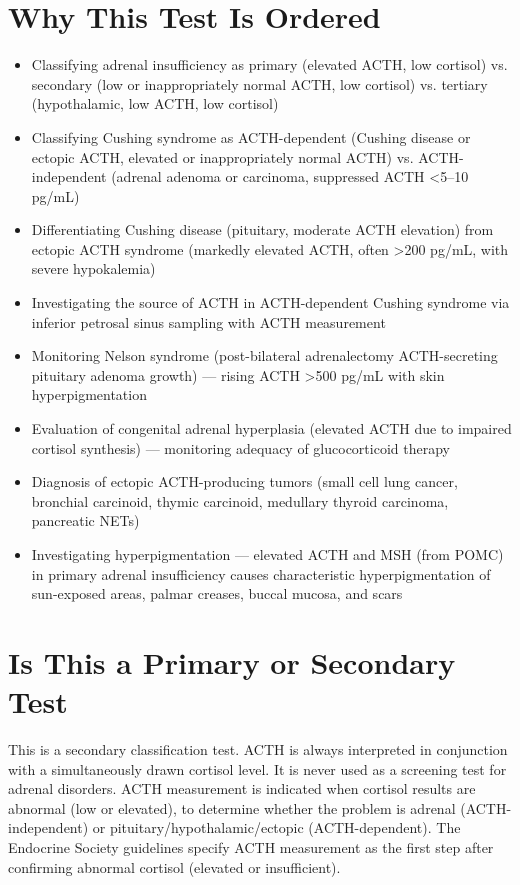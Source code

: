 \section*{Why This Test Is Ordered}
\begin{itemize}
  \item Classifying adrenal insufficiency as primary (elevated ACTH, low cortisol) vs. secondary (low or inappropriately normal ACTH, low cortisol) vs. tertiary (hypothalamic, low ACTH, low cortisol)
  \item Classifying Cushing syndrome as ACTH-dependent (Cushing disease or ectopic ACTH, elevated or inappropriately normal ACTH) vs. ACTH-independent (adrenal adenoma or carcinoma, suppressed ACTH <5--10 pg/mL)
  \item Differentiating Cushing disease (pituitary, moderate ACTH elevation) from ectopic ACTH syndrome (markedly elevated ACTH, often >200 pg/mL, with severe hypokalemia)
  \item Investigating the source of ACTH in ACTH-dependent Cushing syndrome via inferior petrosal sinus sampling with ACTH measurement
  \item Monitoring Nelson syndrome (post-bilateral adrenalectomy ACTH-secreting pituitary adenoma growth) --- rising ACTH >500 pg/mL with skin hyperpigmentation
  \item Evaluation of congenital adrenal hyperplasia (elevated ACTH due to impaired cortisol synthesis) --- monitoring adequacy of glucocorticoid therapy
  \item Diagnosis of ectopic ACTH-producing tumors (small cell lung cancer, bronchial carcinoid, thymic carcinoid, medullary thyroid carcinoma, pancreatic NETs)
  \item Investigating hyperpigmentation --- elevated ACTH and MSH (from POMC) in primary adrenal insufficiency causes characteristic hyperpigmentation of sun-exposed areas, palmar creases, buccal mucosa, and scars
\end{itemize}

\section*{Is This a Primary or Secondary Test}
This is a secondary classification test. ACTH is always interpreted in conjunction with a simultaneously drawn cortisol level. It is never used as a screening test for adrenal disorders. ACTH measurement is indicated when cortisol results are abnormal (low or elevated), to determine whether the problem is adrenal (ACTH-independent) or pituitary/hypothalamic/ectopic (ACTH-dependent). The Endocrine Society guidelines specify ACTH measurement as the first step after confirming abnormal cortisol (elevated or insufficient).

